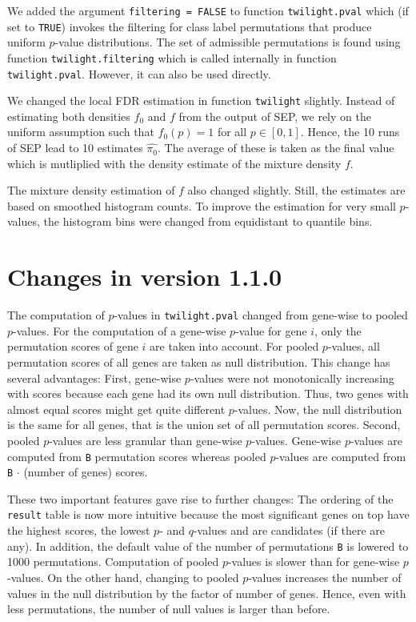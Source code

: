 \documentclass[11pt,a4paper,fleqn]{article}
\newcommand{\Robject}[1]{{\texttt{#1}}}
\newcommand{\Rfunction}[1]{{\texttt{#1}}}
\newcommand{\Rfunarg}[1]{{\texttt{#1}}}
\begin{document}
We added the argument \Rfunarg{filtering = FALSE} to function \Rfunction{twilight.pval} which (if set to \Rfunarg{TRUE}) invokes the filtering for class label permutations that produce uniform $p$-value distributions. The set of admissible permutations is found using function \Rfunarg{twilight.filtering} which is called internally in function \Rfunarg{twilight.pval}. However, it can also be used directly.

We changed the local FDR estimation in function \Rfunction{twilight} slightly. Instead of estimating both densities $f_0$ and $f$ from the output of SEP, we rely on the uniform assumption such that $f_0(p)=1$ for all $p \in [0,1]$. Hence, the 10 runs of SEP lead to 10 estimates $\widehat{\pi_0}$. The average of these is taken as the final value which is mutliplied with the density estimate of the mixture density $f$.

The mixture density estimation of $f$ also changed slightly. Still, the estimates are based on smoothed histogram counts. To improve the estimation for very small $p$-values, the histogram bins were changed from equidistant to quantile bins.


\section{Changes in version 1.1.0}

The computation of $p$-values in \Rfunction{twilight.pval} changed from gene-wise to pooled $p$-values. For the computation of a gene-wise $p$-value for gene $i$, only the permutation scores of gene $i$ are taken into account. For pooled $p$-values, all permutation scores of all genes are taken as null distribution. This change has several advantages: First, gene-wise $p$-values were not monotonically increasing with scores because each gene had its own null distribution. Thus, two genes with almost equal scores might get quite different $p$-values. Now, the null distribution is the same for all genes, that is the union set of all permutation scores. Second, pooled $p$-values are less granular than gene-wise $p$-values. Gene-wise $p$-values are computed from \Rfunarg{B} permutation scores whereas pooled $p$-values are computed from \Rfunarg{B} $\cdot$ (number of genes) scores.

These two important features gave rise to further changes: The ordering of the \Robject{result} table is now more intuitive because the most significant genes on top have the highest scores, the lowest $p$- and $q$-values and are candidates (if there are any). In addition, the default value of the number of permutations \Rfunarg{B} is lowered to 1000 permutations. Computation of pooled $p$-values is slower than for gene-wise $p$-values. On the other hand, changing to pooled $p$-values increases the number of values in the null distribution by the factor of number of genes. Hence, even with less permutations, the number of null values is larger than before.
\end{document}
